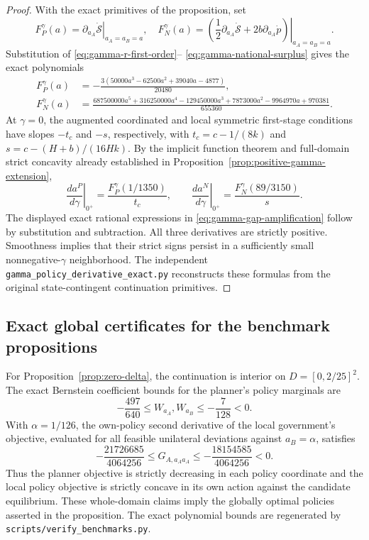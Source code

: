 \begin{proof}
With the exact primitives of the proposition, set
\[
F_P^\gamma(a)=
\left.\partial_{a_A}\dot{\mathcal S}
\right|_{a_A=a_B=a},
\quad
F_N^\gamma(a)=
\left.\left(
\frac12\partial_{a_A}\dot{\mathcal S}
+2b\partial_{a_A}\dot p
\right)\right|_{a_A=a_B=a}.
\]
Substitution of \eqref{eq:gamma-r-first-order}--
\eqref{eq:gamma-national-surplus} gives the exact
polynomials
\begin{align*}
F_P^\gamma(a)
&=-\frac{3(50000a^3-62500a^2+39040a-4877)}
        {20480},\\
F_N^\gamma(a)
&=\frac{
687500000a^5+316250000a^4-129450000a^3+
7873000a^2-9964970a+970381
}{655360}.
\end{align*}
At $\gamma=0$, the augmented coordinated and local
symmetric first-stage conditions have slopes
$-t_c$ and $-s$, respectively, with
$t_c=c-1/(8k)$ and $s=c-(H+b)/(16Hk)$.
By the implicit function theorem and full-domain
strict concavity already established in
Proposition~\ref{prop:positive-gamma-extension},
\[
\left.\frac{da^P}{d\gamma}\right|_{0^+}
=\frac{F_P^\gamma(1/1350)}{t_c},
\qquad
\left.\frac{da^N}{d\gamma}\right|_{0^+}
=\frac{F_N^\gamma(89/3150)}{s}.
\]
The displayed exact rational expressions in
\eqref{eq:gamma-gap-amplification} follow by
substitution and subtraction. All three derivatives
are strictly positive. Smoothness implies that their
strict signs persist in a sufficiently small
nonnegative-$\gamma$ neighborhood.
The independent \texttt{gamma\_policy\_derivative\_exact.py}
reconstructs these formulas from the original
state-contingent continuation primitives.
\end{proof}


\subsection{Exact global certificates for the benchmark propositions}
\label{app:jpet-benchmark-certs}

For Proposition~\ref{prop:zero-delta}, the continuation is interior on
$D=[0,2/25]^2$. The exact Bernstein coefficient bounds for the
planner's policy marginals are
\[
-\frac{497}{640}\leq W_{a_A},W_{a_B}\leq-\frac7{128}<0.
\]
With $\alpha=1/126$, the own-policy second derivative of the
local government's objective, evaluated for all feasible unilateral
deviations against $a_B=\alpha$, satisfies
\[
-\frac{21726685}{4064256}\leq G_{A,a_Aa_A}
\leq-\frac{18154585}{4064256}<0.
\]
Thus the planner objective is strictly decreasing in each policy
coordinate and the local policy objective is strictly concave in its
own action against the candidate equilibrium. These whole-domain
claims imply the globally optimal policies asserted in the proposition.
The exact polynomial bounds are regenerated by
\texttt{scripts/verify\_benchmarks.py}.

